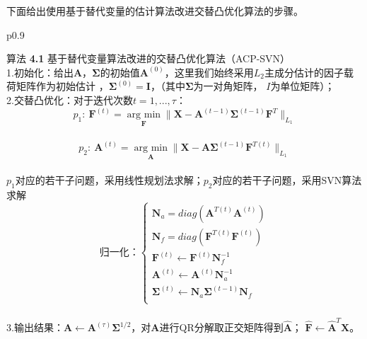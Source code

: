 下面给出使用基于替代变量的估计算法改进交替凸优化算法的步骤。
\begin{table}[H]%
    \centering%
    \begin{tabular}{{p{0.9\columnwidth}}}%
    
    \toprule%
    {\heiti 算法} {\bf 4.1} 基于替代变量算法改进的交替凸优化算法（ACP-SVN） \\
    \midrule%
    1.初始化：给出$\bm{A}$，$\bm \Sigma$的初始值$\bm{A}^{(0)}$，这里我们始终采用$L_2$主成分估计的因子载荷矩阵作为初始估计
    ，$\bm \Sigma^{(0)} = \bm I$，（其中$\bm \Sigma$为一对角矩阵，
    $I$为单位矩阵）； \\

    2.交替凸优化：对于迭代次数$t = 1, ..., \tau$： \\
    $$p_1:\ \bm F^{(t)} = \underset{\bm F}{\operatorname{arg\ min}} \|\bm X - \bm{A}^{(t-1)}\bm\Sigma^{(t-1)}
    \bm F^{T}\|_{L_1}$$ \\
    $$p_2:\ \bm{A}^{(t)} = \underset{\bm{A}}{\operatorname{arg\ min}} \|\bm X - \bm{A}\bm\Sigma^{(t-1)}\bm F^{T(t)} \|_{L_1}$$ \\
    $p_1$对应的若干子问题，采用线性规划法求解；$p_2$对应的若干子问题，采用SVN算法求解\\
    \begin{equation*}
        \text{归一化：}\left\{
                    \begin{array}{clr}
                    \bm N_a = diag(\bm{A}^{T(t)}\bm{A}^{(t)})\\
                    \bm N_f = diag(\bm F^{T(t)}\bm F^{(t)})\\
                    \bm F^{(t)} \leftarrow \bm F^{(t)}\bm N_f^{-1}\\
                    \bm{A}^{(t)}\leftarrow \bm{A}^{(t)}\bm N_a^{-1}\\
                    \bm \Sigma^{(t)} \leftarrow \bm N_a\bm\Sigma^{(t-1)}\bm N_f\\
                    \end{array}
        \right.
    \end{equation*} \\

    3.输出结果：$\bm{A} \leftarrow \bm{A}^{(\tau)}\bm\Sigma^{1/2}$，对$\bm{A}$进行QR分解取正交矩阵得到$\hat{\bm{A}}$；
    $\hat{\bm{F}} \leftarrow \hat{\bm{A}}^T\bm{X}$。
     \\
    \bottomrule%
    \end{tabular}
\end{table}%

